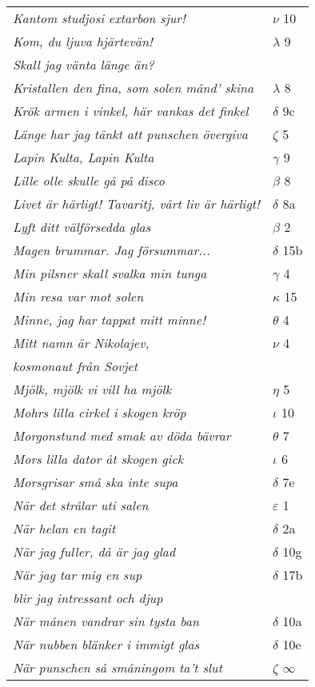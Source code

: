 \documentclass[a6paper,10pt]{article}
\begin{document}
\newpage
\setlength{\oddsidemargin}{-0.47in}
\begin{table}[!h]
\begin{tabular}{l l}
\textit{Kantom studjosi extarbon sjur!}	&$\nu$ 10\\
\textit{Kom, du ljuva hjärtevän!}	&$\lambda$ 9\\
\textit{Skall jag vänta länge än?} &\\
\textit{Kristallen den fina, som solen månd' skina}	&$\lambda$ 8\\
\textit{Krök armen i vinkel, här vankas det finkel}	&$\delta$ 9c\\
\textit{Länge har jag tänkt att punschen övergiva}	&$\zeta$ 5\\
\textit{Lapin Kulta, Lapin Kulta}	&$\gamma$ 9\\
\textit{Lille olle skulle gå på disco}	&$\beta$ 8\\
\textit{Livet är härligt! Tavaritj, vårt liv är härligt!}	&$\delta$ 8a\\
\textit{Lyft ditt välförsedda glas}	&$\beta$ 2\\
\textit{Magen brummar. Jag försummar...}	&$\delta$ 15b\\
\textit{Min pilsner skall svalka min tunga}	&$\gamma$ 4\\
\textit{Min resa var mot solen} &$\kappa$ 15\\
\textit{Minne, jag har tappat mitt minne!}	&$\theta$ 4\\
\textit{Mitt namn är Nikolajev,}	&$\nu$ 4\\
\textit{kosmonaut från Sovjet} &\\
\textit{Mjölk, mjölk vi vill ha mjölk}	&$\eta$ 5\\
\textit{Mohrs lilla cirkel i skogen kröp}	&$\iota$ 10\\
\textit{Morgonstund med smak av döda bävrar}	&$\theta$ 7\\
\textit{Mors lilla dator åt skogen gick}	&$\iota$ 6\\
\textit{Morsgrisar små ska inte supa}	&$\delta$ 7e\\
\textit{När det strålar uti salen}	&$\varepsilon$ 1\\
\textit{När helan en tagit}	&$\delta$ 2a\\
\textit{När jag fuller, då är jag glad}	&$\delta$ 10g\\
\textit{När jag tar mig en sup}	&$\delta$ 17b\\
\textit{blir jag intressant och djup} &\\
\textit{När månen vandrar sin tysta ban}	&$\delta$ 10a\\
\textit{När nubben blänker i immigt glas}	&$\delta$ 10e\\
\textit{När punschen så småningom ta't slut}	&$\zeta$ $\infty$\\
\end{tabular}
\end{table}
\end{document}
